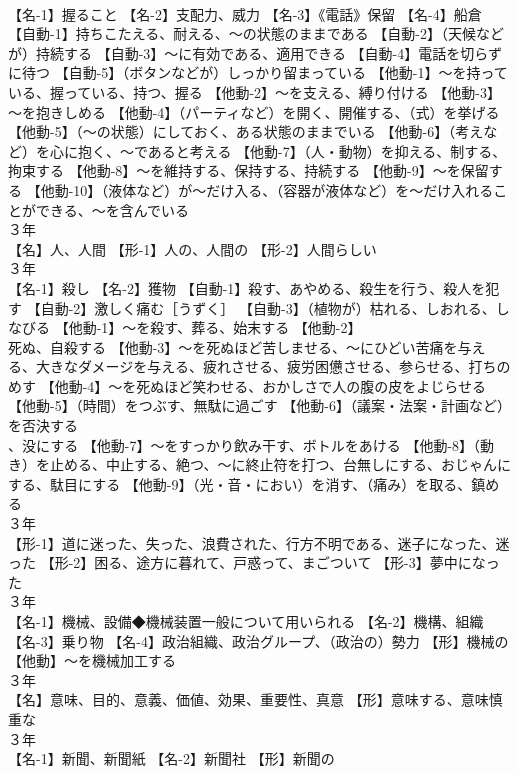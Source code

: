 \documentclass[8pt]{extreport}
\begin{document}
\begin{CJK}{UTF8}{min}
\\	【名-1】握ること 【名-2】支配力、威力 【名-3】《電話》保留 【名-4】船倉 【自動-1】持ちこたえる、耐える、～の状態のままである 【自動-2】（天候などが）持続する 【自動-3】～に有効である、適用できる 【自動-4】電話を切らずに待つ 【自動-5】（ボタンなどが）しっかり留まっている 【他動-1】～を持っている、握っている、持つ、握る 【他動-2】～を支える、縛り付ける 【他動-3】～を抱きしめる 【他動-4】（パーティなど）を開く、開催する、（式）を挙げる 【他動-5】（～の状態）にしておく、ある状態のままでいる 【他動-6】（考えなど）を心に抱く、～であると考える 【他動-7】（人・動物）を抑える、制する、拘束する 【他動-8】～を維持する、保持する、持続する 【他動-9】～を保留する 【他動-10】（液体など）が～だけ入る、（容器が液体など）を～だけ入れることができる、～を含んでいる
\\	３年	
\\	【名】人、人間 【形-1】人の、人間の 【形-2】人間らしい
\\	３年	
\\	【名-1】殺し 【名-2】獲物 【自動-1】殺す、あやめる、殺生を行う、殺人を犯す 【自動-2】激しく痛む［うずく］ 【自動-3】（植物が）枯れる、しおれる、しなびる 【他動-1】～を殺す、葬る、始末する 【他動-2】
\\	死ぬ、自殺する 【他動-3】～を死ぬほど苦しませる、～にひどい苦痛を与える、大きなダメージを与える、疲れさせる、疲労困憊させる、参らせる、打ちのめす 【他動-4】～を死ぬほど笑わせる、おかしさで人の腹の皮をよじらせる 【他動-5】（時間）をつぶす、無駄に過ごす 【他動-6】（議案・法案・計画など）を否決する
\\	、没にする 【他動-7】～をすっかり飲み干す、ボトルをあける 【他動-8】（動き）を止める、中止する、絶つ、～に終止符を打つ、台無しにする、おじゃんにする、駄目にする 【他動-9】（光・音・におい）を消す、（痛み）を取る、鎮める
\\	３年	
\\	【形-1】道に迷った、失った、浪費された、行方不明である、迷子になった、迷った 【形-2】困る、途方に暮れて、戸惑って、まごついて 【形-3】夢中になった
\\	３年	
\\	【名-1】機械、設備◆機械装置一般について用いられる 【名-2】機構、組織 【名-3】乗り物 【名-4】政治組織、政治グループ、（政治の）勢力 【形】機械の 【他動】～を機械加工する
\\	３年	
\\	【名】意味、目的、意義、価値、効果、重要性、真意 【形】意味する、意味慎重な
\\	３年	
\\	【名-1】新聞、新聞紙 【名-2】新聞社 【形】新聞の

\end{CJK}
\end{document}
